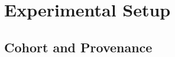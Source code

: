\newcommand{\REQEXP}{\texttt{[R-E]}}


\section{Experimental Setup}
\label{sec:setup}

\subsection{Cohort and Provenance}
\label{subsec:cohort}


